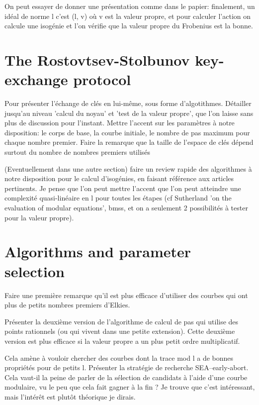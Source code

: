 \documentclass{article}
\begin{document}
On peut essayer de donner une présentation comme dans le papier:
finalement, un idéal de norme l c'est (l, v) où v est la valeur
propre, et pour calculer l'action on calcule une isogénie et l'on
vérifie que la valeur propre du Frobenius est la bonne.

\section{The Rostovtsev-Stolbunov key-exchange protocol}

Pour présenter l'échange de clés en lui-même, sous forme
d'algotithmes.  Détailler jusqu'au niveau 'calcul du noyau' et 'test
de la valeur propre', que l'on laisse sans plus de discussion pour
l'instant.  Mettre l'accent sur les paramètres à notre disposition: le
corps de base, la courbe initiale, le nombre de pas maximum pour
chaque nombre premier.  Faire la remarque que la taille de l'espace de
clés dépend surtout du nombre de nombres premiers utilisés

(Eventuellement dans une autre section) faire un review rapide des
algorithmes à notre disposition pour le calcul d'isogénies, en faisant
référence aux articles pertinents.  Je pense que l'on peut mettre
l'accent que l'on peut atteindre une complexité quasi-linéaire en l
pour toutes les étapes (cf Sutherland 'on the evaluation of modular
equations', bmss, et on a seulement 2 possibilités à tester pour la
valeur propre).

\section{Algorithms and parameter selection}

Faire une première remarque qu'il est plus efficace d'utiliser des
courbes qui ont plus de petits nombres premiers d'Elkies.

Présenter la deuxième version de l'algorithme de calcul de pas qui
utilise des points rationnels (ou qui vivent dans une petite
extension). Cette deuxième version est plus efficace si la valeur
propre a un plus petit ordre multiplicatif.

Cela amène à vouloir chercher des courbes dont la trace mod l a de
bonnes propriétés pour de petits l. Présenter la stratégie de
recherche SEA--early-abort. Cela vaut-il la peine de parler de la
sélection de candidats à l'aide d'une courbe modulaire, vu le peu que
cela fait gagner à la fin ? Je trouve que c'est intéressant, mais
l'intérêt est plutôt théorique je dirais.
\end{document}
